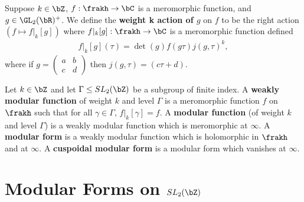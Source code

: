 \begin{lem}\label{lem:weight-k-action-on-mero-func}
	Suppose $k \in \bZ$, $f:\frakh \to \bC$ is a meromorphic function, and $g \in \GL_2(\bR)^+$. We define the \textbf{weight k action of $g$} on $f$ to be the right action $\left(f \mapsto f|_k[g]\right)$ where $f|_k[g]:\frakh \to \bC$ is a meromorphic function defined
	\begin{align*}
		f |_k[g](\tau) = \det(g) f(g\tau)j(g,\tau)^k,
	\end{align*}
	where if $g = \begin{pmatrix}a & b \\ c & d\end{pmatrix}$ then $j(g,\tau) = (c\tau + d)$.
\end{lem}

\begin{defn}\label{defn:weakly-mod-func-to-mod-forms}
	Let $k \in \bZ$ and let $\Gamma \leq SL_2(\bZ)$ be a subgroup of finite index. A \textbf{weakly modular function} of weight $k$ and level $\Gamma$ is a meromorphic function $f$ on $\frakh$ such that for all  $\gamma \in \Gamma$, $f|_k[\gamma] = f$. A \textbf{modular function} (of weight $k$ and level $\Gamma$) is a weakly modular function which is meromorphic at $\infty$. A \textbf{modular form} is a weakly modular function which is holomorphic in $\frakh$ and at $\infty$. A \textbf{cuspoidal modular form} is a modular form which vanishes at $\infty$. 
\end{defn}

\section{Modular Forms on \texorpdfstring{$SL_2(\bZ)$}{the Special Linear Group}}

